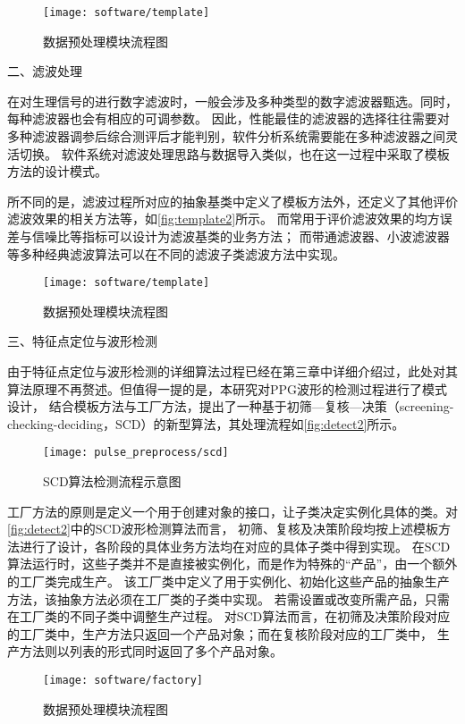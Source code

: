 \begin{figure}[htbp]
    \centering
    \texttt{[image: software/template]}
    \caption{\label{fig:template}数据预处理模块流程图}
\end{figure}

二、滤波处理

在对生理信号的进行数字滤波时，一般会涉及多种类型的数字滤波器甄选。同时，每种滤波器也会有相应的可调参数。
因此，性能最佳的滤波器的选择往往需要对多种滤波器调参后综合测评后才能判别，软件分析系统需要能在多种滤波器之间灵活切换。
软件系统对滤波处理思路与数据导入类似，也在这一过程中采取了模板方法的设计模式。

所不同的是，滤波过程所对应的抽象基类中定义了模板方法外，还定义了其他评价滤波效果的相关方法等，如\autoref{fig:template2}所示。
而常用于评价滤波效果的均方误差与信噪比等指标可以设计为滤波基类的业务方法；
而带通滤波器、小波滤波器等多种经典滤波算法可以在不同的滤波子类滤波方法中实现。
\begin{figure}[htbp]
    \centering
    \texttt{[image: software/template]}
    \caption{\label{fig:template2}数据预处理模块流程图}
\end{figure}

三、特征点定位与波形检测

由于特征点定位与波形检测的详细算法过程已经在第三章中详细介绍过，此处对其算法原理不再赘述。但值得一提的是，本研究对PPG波形的检测过程进行了模式设计，
结合模板方法与工厂方法，提出了一种基于初筛—复核—决策（screening-checking-deciding，SCD）的新型算法，其处理流程如\autoref{fig:detect2}所示。
\begin{figure}[htbp]
    \centering
    \texttt{[image: pulse\_preprocess/scd]}
    \caption{\label{fig:detect2}SCD算法检测流程示意图}
\end{figure}

工厂方法的原则是定义一个用于创建对象的接口，让子类决定实例化具体的类。对\autoref{fig:detect2}中的SCD波形检测算法而言，
初筛、复核及决策阶段均按上述模板方法进行了设计，各阶段的具体业务方法均在对应的具体子类中得到实现。
在SCD算法运行时，这些子类并不是直接被实例化，而是作为特殊的“产品”，由一个额外的工厂类完成生产。
该工厂类中定义了用于实例化、初始化这些产品的抽象生产方法，该抽象方法必须在工厂类的子类中实现。
若需设置或改变所需产品，只需在工厂类的不同子类中调整生产过程。
对SCD算法而言，在初筛及决策阶段对应的工厂类中，生产方法只返回一个产品对象；而在复核阶段对应的工厂类中，
生产方法则以列表的形式同时返回了多个产品对象。

\begin{figure}[htbp]
    \centering
    \texttt{[image: software/factory]}
    \caption{\label{fig:factory}数据预处理模块流程图}
\end{figure}

